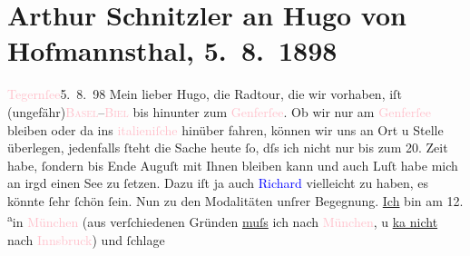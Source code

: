 

               \section[Arthur Schnitzler an Hugo von Hofmannsthal, 5. 8. 1898]{ Arthur Schnitzler an Hugo von Hofmannsthal, 5. 8. 1898}\nopagebreak{}\rehead{ }\normalsize\beginnumbering{} \toendnotes[C]{\smallbreak\pagebreak[2]} 
\toendnotes[C]{\smallbreak}\pstart
           \raggedleft{}{\pb}\textcolor{pink}{Tegernſee}{}\ledrightnote{\textcolor{pink}{Tegernsee}}{ }5. 8. 98\pend
           \pstart
           Mein lieber Hugo, die Radtour, die wir vorhaben, iſt \introOben{}(\introOben{}ungefähr\introOben{})\introOben{}{ }\textcolor{pink}{\textsc{Basel}}{}\ledrightnote{\textcolor{pink}{Basel}}–\textcolor{pink}{\textsc{Biel}}{}\ledrightnote{\textcolor{pink}{Biel}} bis hinunter zum \textcolor{pink}{Genferſee}{}\ledrightnote{\textcolor{pink}{Genfer See}}. Ob wir nur am
                        \textcolor{pink}{Genferſee}{}\ledrightnote{\textcolor{pink}{Genfer See}} bleiben oder da{\geminationn} ins \textcolor{pink}{italieniſche}{}\ledrightnote{\textcolor{pink}{Italien}} hinüber fahren, können wir uns an Ort u Stelle überlegen,
                    jedenfalls ſteht die Sache heute ſo, dſs ich nicht nur bis zum 20.
                    Zeit habe, ſondern bis Ende Auguſt mit Ihnen bleiben kann und auch
                    Luſt habe {\pb}mich an irgd einen See zu ſetzen. Dazu iſt
                    ja auch \textcolor{blue}{Richard}{}\ledrightnote{\textcolor{blue}{Richard Beer-Hofmann}} vielleicht zu haben, es
                    könnte ſehr ſchön ſein.\pend
           \pstart
           Nun zu den Modalitäten unſrer Begegnung. \uline{Ich} bin
                    am 12.{ }\substVorne{}\textsuperscript{a}\substDazwischen{}i\substHinten{}n \textcolor{pink}{München}{}\ledrightnote{\textcolor{pink}{München}} (aus verſchiedenen Gründen
                        \uline{muſs} ich nach \textcolor{pink}{München}{}\ledrightnote{\textcolor{pink}{München}}, u \uline{ka{\geminationn}
                        nicht} nach \textcolor{pink}{Innsbruck}{}\ledrightnote{\textcolor{pink}{Innsbruck}}) und ſchlage
